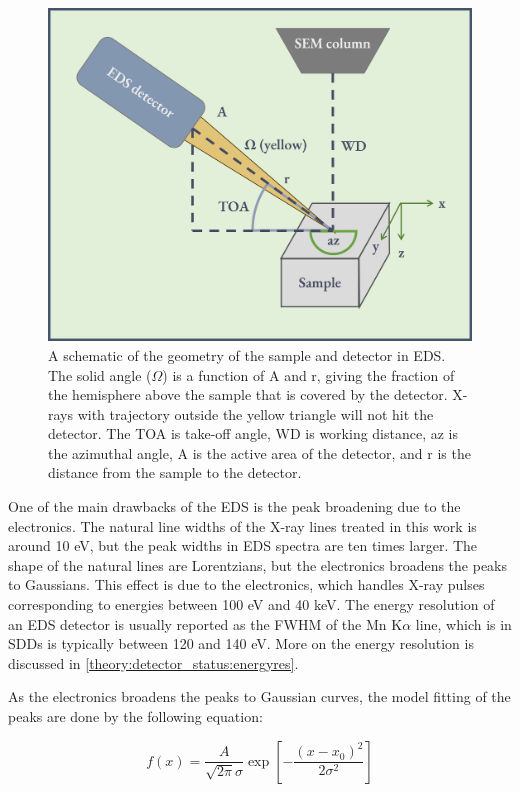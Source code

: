 \begin{figure}[ht]
    \centering
    \includegraphics[width=0.6\linewidth]{figures/EDS_geometry.png}
    \caption{
        A schematic of the geometry of the sample and detector in EDS.
        The solid angle ($\Omega$) is a function of A and r, giving the fraction of the hemisphere above the sample that is covered by the detector.
        X-rays with trajectory outside the yellow triangle will not hit the detector.
        The TOA is take-off angle, WD is working distance, az is the azimuthal angle, A is the active area of the detector, and r is the distance from the sample to the detector.
    }
    \label{fig:eds_geometry}
\end{figure}






One of the main drawbacks of the EDS is the peak broadening due to the electronics.
The natural line widths of the X-ray lines treated in this work is around 10 eV, but the peak widths in EDS spectra are ten times larger.
The shape of the natural lines are Lorentzians, but the electronics broadens the peaks to Gaussians.
This effect is due to the electronics, which handles X-ray pulses corresponding to energies between 100 eV and 40 keV.
The energy resolution of an EDS detector is usually reported as the FWHM of the Mn K$\alpha$ line, which is in SDDs is typically between 120 and 140 eV.
More on the energy resolution is discussed in \cref{theory:detector_status:energyres}.


As the electronics broadens the peaks to Gaussian curves, the model fitting of the peaks are done by the following equation:

\begin{equation}
    \label{eq:gaussian}
    f(x) = \frac{A}{\sqrt{2\pi}\sigma}\exp\left[{-\frac{(x-x_0)^2}{2\sigma^2}}\right]
\end{equation}

